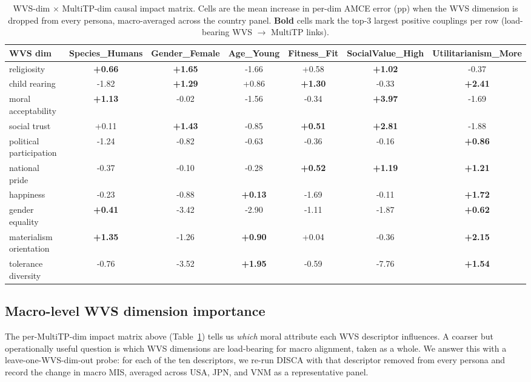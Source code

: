 \documentclass{article}
\begin{document}
\begin{table}[H]\centering\scriptsize
\caption{WVS-dim $\times$ MultiTP-dim causal impact matrix. Cells are the mean increase in per-dim AMCE error (pp) when the WVS dimension is dropped from every persona, macro-averaged across the country panel. \textbf{Bold} cells mark the top-3 largest positive couplings per row (load-bearing WVS $\to$ MultiTP links).}
\label{tab:wvs_impact_matrix}
\setlength{\tabcolsep}{4pt}
\begin{tabular}{lcccccc}\toprule
WVS dim & Species\_Humans & Gender\_Female & Age\_Young & Fitness\_Fit & SocialValue\_High & Utilitarianism\_More \\\midrule
religiosity & \textbf{+0.66} & \textbf{+1.65} & -1.66 & +0.58 & \textbf{+1.02} & -0.37 \\
child rearing & -1.82 & \textbf{+1.29} & +0.86 & \textbf{+1.30} & -0.33 & \textbf{+2.41} \\
moral acceptability & \textbf{+1.13} & -0.02 & -1.56 & -0.34 & \textbf{+3.97} & -1.69 \\
social trust & +0.11 & \textbf{+1.43} & -0.85 & \textbf{+0.51} & \textbf{+2.81} & -1.88 \\
political participation & -1.24 & -0.82 & -0.63 & -0.36 & -0.16 & \textbf{+0.86} \\
national pride & -0.37 & -0.10 & -0.28 & \textbf{+0.52} & \textbf{+1.19} & \textbf{+1.21} \\
happiness & -0.23 & -0.88 & \textbf{+0.13} & -1.69 & -0.11 & \textbf{+1.72} \\
gender equality & \textbf{+0.41} & -3.42 & -2.90 & -1.11 & -1.87 & \textbf{+0.62} \\
materialism orientation & \textbf{+1.35} & -1.26 & \textbf{+0.90} & +0.04 & -0.36 & \textbf{+2.15} \\
tolerance diversity & -0.76 & -3.52 & \textbf{+1.95} & -0.59 & -7.76 & \textbf{+1.54} \\
\bottomrule
\end{tabular}
\end{table}

\subsection{Macro-level WVS dimension importance}
\label{sec:wvs_dropout}

The per-MultiTP-dim impact matrix above (Table~\ref{tab:wvs_impact_matrix}) tells us \emph{which} moral attribute each WVS descriptor influences. A coarser but operationally useful question is which WVS dimensions are load-bearing for macro alignment, taken as a whole. We answer this with a leave-one-WVS-dim-out probe: for each of the ten descriptors, we re-run DISCA with that descriptor removed from every persona and record the change in macro MIS, averaged across USA, JPN, and VNM as a representative panel.
\end{document}
